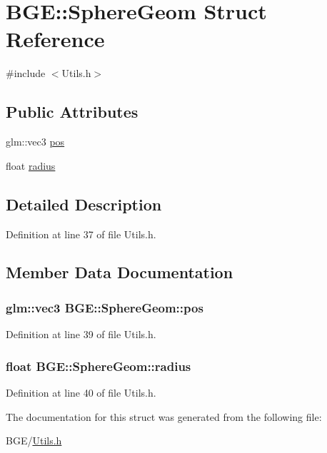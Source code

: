 \hypertarget{struct_b_g_e_1_1_sphere_geom}{\section{B\-G\-E\-:\-:Sphere\-Geom Struct Reference}
\label{struct_b_g_e_1_1_sphere_geom}
}


{\ttfamily \#include $<$Utils.\-h$>$}

\subsection*{Public Attributes}
\begin{DoxyCompactItemize}
\item 
glm\-::vec3 \hyperlink{struct_b_g_e_1_1_sphere_geom_a85f6534c5c6f97a42d839179555c48c9}{pos}
\item 
float \hyperlink{struct_b_g_e_1_1_sphere_geom_a4d573ac3554942cdf5c00116b204a559}{radius}
\end{DoxyCompactItemize}


\subsection{Detailed Description}


Definition at line 37 of file Utils.\-h.



\subsection{Member Data Documentation}
\hypertarget{struct_b_g_e_1_1_sphere_geom_a85f6534c5c6f97a42d839179555c48c9}{
\subsubsection[{pos}]{\setlength{\rightskip}{0pt plus 5cm}glm\-::vec3 B\-G\-E\-::\-Sphere\-Geom\-::pos}}\label{struct_b_g_e_1_1_sphere_geom_a85f6534c5c6f97a42d839179555c48c9}


Definition at line 39 of file Utils.\-h.

\hypertarget{struct_b_g_e_1_1_sphere_geom_a4d573ac3554942cdf5c00116b204a559}{
\subsubsection[{radius}]{\setlength{\rightskip}{0pt plus 5cm}float B\-G\-E\-::\-Sphere\-Geom\-::radius}}\label{struct_b_g_e_1_1_sphere_geom_a4d573ac3554942cdf5c00116b204a559}


Definition at line 40 of file Utils.\-h.



The documentation for this struct was generated from the following file\-:\begin{DoxyCompactItemize}
\item 
B\-G\-E/\hyperlink{_utils_8h}{Utils.\-h}\end{DoxyCompactItemize}
